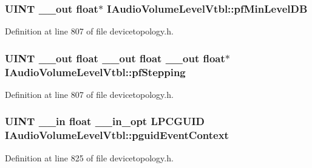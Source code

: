 \subsubsection[{\texorpdfstring{pf\+Min\+Level\+DB}{pfMinLevelDB}}]{ {\bf U\+I\+NT} {\bf \+\_\+\+\_\+out} float$\ast$ I\+Audio\+Volume\+Level\+Vtbl\+::pf\+Min\+Level\+DB}\hypertarget{struct_i_audio_volume_level_vtbl_a69efb742cd38b05ff9699274e0c1c921}{}\label{struct_i_audio_volume_level_vtbl_a69efb742cd38b05ff9699274e0c1c921}


Definition at line 807 of file devicetopology.\+h.

\subsubsection[{\texorpdfstring{pf\+Stepping}{pfStepping}}]{ {\bf U\+I\+NT} {\bf \+\_\+\+\_\+out} float {\bf \+\_\+\+\_\+out} float {\bf \+\_\+\+\_\+out} float$\ast$ I\+Audio\+Volume\+Level\+Vtbl\+::pf\+Stepping}\hypertarget{struct_i_audio_volume_level_vtbl_ae9956e4b268953741743dc8f66142230}{}\label{struct_i_audio_volume_level_vtbl_ae9956e4b268953741743dc8f66142230}


Definition at line 807 of file devicetopology.\+h.

\subsubsection[{\texorpdfstring{pguid\+Event\+Context}{pguidEventContext}}]{ {\bf U\+I\+NT} {\bf \+\_\+\+\_\+in} float {\bf \+\_\+\+\_\+in\+\_\+opt} {\bf L\+P\+C\+G\+U\+ID} I\+Audio\+Volume\+Level\+Vtbl\+::pguid\+Event\+Context}\hypertarget{struct_i_audio_volume_level_vtbl_a256c228c3020ff80613efc9f2c664257}{}\label{struct_i_audio_volume_level_vtbl_a256c228c3020ff80613efc9f2c664257}


Definition at line 825 of file devicetopology.\+h.

